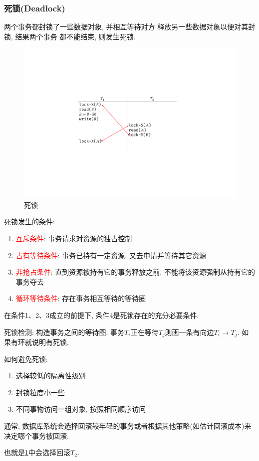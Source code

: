 \subsubsection{死锁(Deadlock)}

两个事务都封锁了一些数据对象, 并相互等待对方
释放另一些数据对象以便对其封锁, 结果两个事务
都不能结束, 则发生死锁.

\begin{figure}[H]
    \centering
    \includegraphics[width=.5\textwidth]{figure/死锁.pdf}
    \caption{死锁}
    \label{fig:deadlock}
\end{figure}

死锁发生的条件:
\begin{enumerate}
    \item \textcolor{red}{互斥条件}: 事务请求对资源的独占控制
    \item \textcolor{red}{占有等待条件}: 事务已持有一定资源, 又去申请并等待其它资源
    \item \textcolor{red}{非抢占条件}: 直到资源被持有它的事务释放之前, 不能将该资源强制从持有它的事务夺去
    \item \textcolor{red}{循环等待条件}: 存在事务相互等待的等待圈
\end{enumerate}

\begin{theorem}
  在条件1、2、3成立的前提下, 条件4是死锁存在的充分必要条件.
\end{theorem}

死锁检测: 构造事务之间的等待图. 事务$T_i$正在等待$T_j$则画一条有向边$T_i\to T_j$. 如果有环就说明有死锁.

如何避免死锁:
\begin{enumerate}
    \item 选择较低的隔离性级别
    \item 封锁粒度小一些
    \item 不同事物访问一组对象, 按照相同顺序访问
\end{enumerate}

\begin{remark}
  通常, 数据库系统会选择回滚较年轻的事务或者根据其他策略(如估计回滚成本)来决定哪个事务被回滚.

  也就是\ref{fig:deadlock}中会选择回滚$T_2$.
\end{remark}

